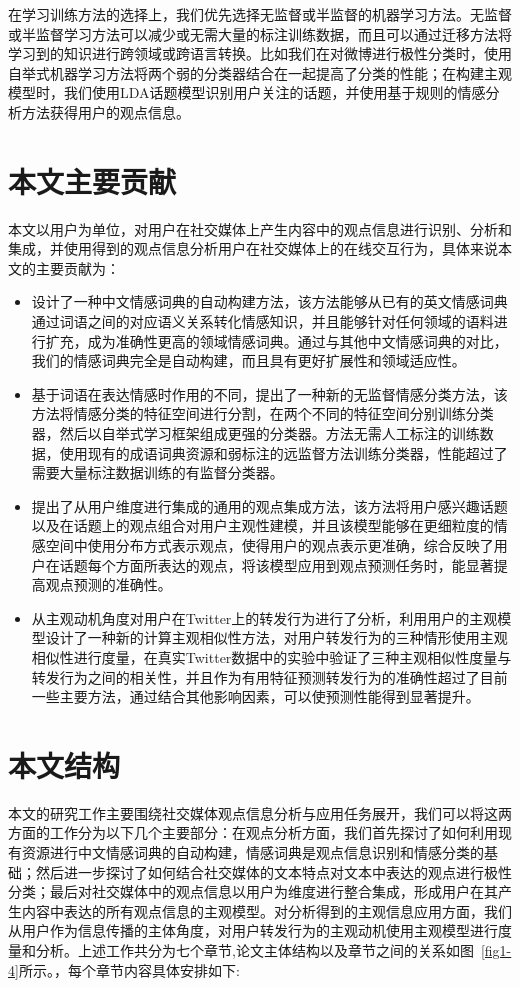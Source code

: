在学习训练方法的选择上，我们优先选择无监督或半监督的机器学习方法。无监督或半监督学习方法可以减少或无需大量的标注训练数据，而且可以通过迁移方法将学习到的知识进行跨领域或跨语言转换。比如我们在对微博进行极性分类时，使用自举式机器学习方法将两个弱的分类器结合在一起提高了分类的性能；在构建主观模型时，我们使用LDA话题模型识别用户关注的话题，并使用基于规则的情感分析方法获得用户的观点信息。  

\section{本文主要贡献}
本文以用户为单位，对用户在社交媒体上产生内容中的观点信息进行识别、分析和集成，并使用得到的观点信息分析用户在社交媒体上的在线交互行为，具体来说本文的主要贡献为：
\begin{itemize}
\item 设计了一种中文情感词典的自动构建方法，该方法能够从已有的英文情感词典通过词语之间的对应语义关系转化情感知识，并且能够针对任何领域的语料进行扩充，成为准确性更高的领域情感词典。通过与其他中文情感词典的对比，我们的情感词典完全是自动构建，而且具有更好扩展性和领域适应性。
\item 基于词语在表达情感时作用的不同，提出了一种新的无监督情感分类方法，该方法将情感分类的特征空间进行分割，在两个不同的特征空间分别训练分类器，然后以自举式学习框架组成更强的分类器。方法无需人工标注的训练数据，使用现有的成语词典资源和弱标注的远监督方法训练分类器，性能超过了需要大量标注数据训练的有监督分类器。
\item 提出了从用户维度进行集成的通用的观点集成方法，该方法将用户感兴趣话题以及在话题上的观点组合对用户主观性建模，并且该模型能够在更细粒度的情感空间中使用分布方式表示观点，使得用户的观点表示更准确，综合反映了用户在话题每个方面所表达的观点，将该模型应用到观点预测任务时，能显著提高观点预测的准确性。
\item 从主观动机角度对用户在Twitter上的转发行为进行了分析，利用用户的主观模型设计了一种新的计算主观相似性方法，对用户转发行为的三种情形使用主观相似性进行度量，在真实Twitter数据中的实验中验证了三种主观相似性度量与转发行为之间的相关性，并且作为有用特征预测转发行为的准确性超过了目前一些主要方法，通过结合其他影响因素，可以使预测性能得到显著提升。
\end{itemize}

\section{本文结构}
本文的研究工作主要围绕社交媒体观点信息分析与应用任务展开，我们可以将这两方面的工作分为以下几个主要部分：在观点分析方面，我们首先探讨了如何利用现有资源进行中文情感词典的自动构建，情感词典是观点信息识别和情感分类的基础；然后进一步探讨了如何结合社交媒体的文本特点对文本中表达的观点进行极性分类；最后对社交媒体中的观点信息以用户为维度进行整合集成，形成用户在其产生内容中表达的所有观点信息的主观模型。对分析得到的主观信息应用方面，我们从用户作为信息传播的主体角度，对用户转发行为的主观动机使用主观模型进行度量和分析。上述工作共分为七个章节,论文主体结构以及章节之间的关系如图~\ref{fig1-4}所示。，每个章节内容具体安排如下:


